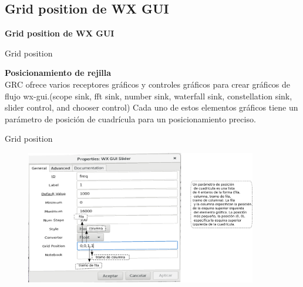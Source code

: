 \subsection{Grid position de WX GUI}
\begin{frame}{}


\bfseries{\textrm{\LARGE Grid position de \newline WX GUI}}
\raggedright
\end{frame}

\begin{frame}{Grid position}


\textbf {Posicionamiento de rejilla} \\
\vspace{2mm}
GRC ofrece varios receptores gráficos y controles gráficos para crear gráficos de flujo wx-gui.(scope sink, fft sink, number sink, waterfall sink, constellation sink, slider control, and chooser control) Cada uno de estos elementos gráficos tiene un parámetro de posición de cuadrícula para un posicionamiento preciso.

\end{frame}

\begin{frame}{Grid position}

\begin{figure}[H]
\centering
\vspace{-3mm}
\includegraphics[width=0.9\textwidth]{parte1/lab00/pdf/lab0_1.pdf}


\end{figure}

\end{frame}

